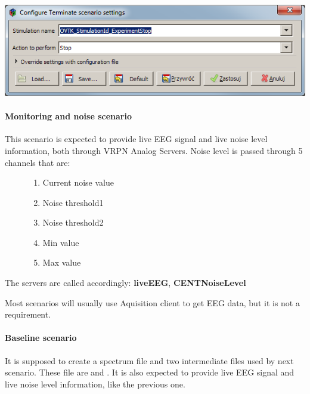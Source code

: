 \documentclass[letterpaper,10pt,english]{sphinxmanual}
\begin{document}
\includegraphics{OVTerminateScenarioConf.png}


\paragraph{Monitoring and noise scenario}
\label{index:monitoring-and-noise-scenario}\begin{description}
\item[{This scenario is expected to provide live EEG signal and live noise level information, both through VRPN Analog Servers. Noise level is passed through 5 channels that are:}] \leavevmode\begin{enumerate}
\item {} 
Current noise value

\item {} 
Noise threshold1

\item {} 
Noise threshold2

\item {} 
Min value

\item {} 
Max value

\end{enumerate}

\end{description}

The servers are called accordingly: \textbf{liveEEG}, \textbf{CENTNoiseLevel}

Most scenarios will usually use Aquisition client to get EEG data, but it is not a requirement.


\paragraph{Baseline scenario}
\label{index:baseline-scenario}
It is supposed to create a  spectrum file and two intermediate files used by next scenario. These file are  and .
It is also expected to provide live EEG signal and live noise level information, like the previous one.
\end{document}
